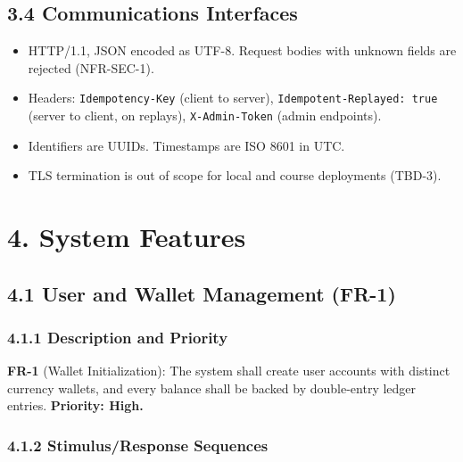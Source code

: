 \documentclass[11pt,a4paper]{article}
\providecommand{\tightlist}{\setlength{\itemsep}{2pt}\setlength{\parskip}{0pt}}
\begin{document}
\subsection{3.4 Communications Interfaces}\label{communications-interfaces}

\begin{itemize}
\tightlist
\item
  HTTP/1.1, JSON encoded as UTF-8. Request bodies with unknown fields are rejected (NFR-SEC-1).
\item
  Headers: \texttt{Idempotency-Key} (client to server), \texttt{Idempotent-Replayed:\ true} (server to client, on
  replays), \texttt{X-Admin-Token} (admin endpoints).
\item
  Identifiers are UUIDs. Timestamps are ISO 8601 in UTC.
\item
  TLS termination is out of scope for local and course deployments (TBD-3).
\end{itemize}

\section{4. System Features}\label{system-features}

\subsection{4.1 User and Wallet Management (FR-1)}\label{user-and-wallet-management-fr-1}

\subsubsection{4.1.1 Description and Priority}\label{description-and-priority}

\textbf{FR-1} (Wallet Initialization): The system shall create user accounts with distinct currency
wallets, and every balance shall be backed by double-entry ledger entries. \textbf{Priority: High.}

\subsubsection{4.1.2 Stimulus/Response Sequences}\label{stimulusresponse-sequences}
\end{document}
